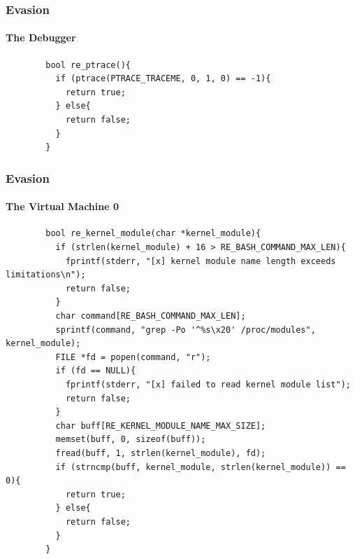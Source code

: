 \documentclass[aspectratio=169]{beamer}
\begin{document}
\begin{frame}[fragile]{}
  \frametitle{Evasion}
  \framesubtitle{The Debugger}
  \begin{center}
    \begin{tcolorbox}[title=re.c,colback=black]
    \begin{minipage}{0.5\textwidth}
      \begin{verbatim}
        bool re_ptrace(){
          if (ptrace(PTRACE_TRACEME, 0, 1, 0) == -1){
            return true;
          } else{
            return false;
          }
        }
      \end{verbatim}
    \end{minipage}
    \end{tcolorbox}
  \end{center}
\end{frame}

\begin{frame}[fragile]{}
  \frametitle{Evasion}
  \framesubtitle{The Virtual Machine 0}
  \begin{center}
    \begin{tcolorbox}[title=re.c,colback=black]
    \begin{minipage}{0.5\textwidth}
      \begin{verbatim}
        bool re_kernel_module(char *kernel_module){
          if (strlen(kernel_module) + 16 > RE_BASH_COMMAND_MAX_LEN){
            fprintf(stderr, "[x] kernel module name length exceeds limitations\n");
            return false;
          }
          char command[RE_BASH_COMMAND_MAX_LEN];
          sprintf(command, "grep -Po '^%s\x20' /proc/modules", kernel_module);
          FILE *fd = popen(command, "r");
          if (fd == NULL){
            fprintf(stderr, "[x] failed to read kernel module list");
            return false;
          }
          char buff[RE_KERNEL_MODULE_NAME_MAX_SIZE];
          memset(buff, 0, sizeof(buff));
          fread(buff, 1, strlen(kernel_module), fd);
          if (strncmp(buff, kernel_module, strlen(kernel_module)) == 0){
            return true;
          } else{
            return false;
          }
        }
      \end{verbatim}
    \end{minipage}
    \end{tcolorbox}
  \end{center}
\end{frame}
\end{document}
